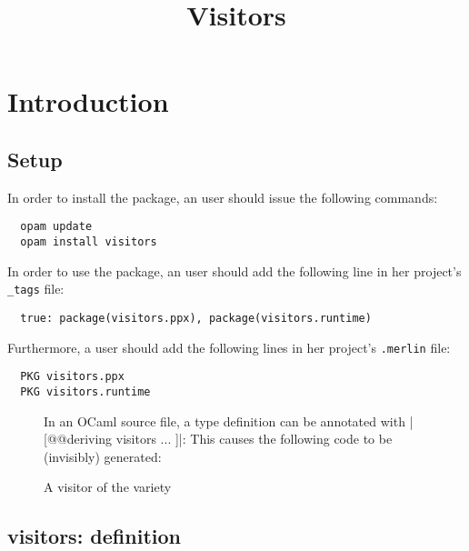 \documentclass[onecolumn,11pt,nocopyrightspace]{sigplanconf}
\title{Visitors}
\begin{document}
\maketitle


\clearpage


\section{Introduction}
\label{sec:intro}

\subsection{Setup}
\label{sec:intro:setup}

In order to install the \visitors package, an \opam user should issue the
following commands:
\begin{verbatim}
  opam update
  opam install visitors
\end{verbatim}
In order to use the \visitors package, an \ocamlbuild user should add the
following line in her project's \texttt{\_tags} file:
\begin{lstlisting}
  true: package(visitors.ppx), package(visitors.runtime)
\end{lstlisting}
Furthermore, a \merlin user should add the following lines in her project's
\texttt{.merlin} file:
\begin{lstlisting}
  PKG visitors.ppx
  PKG visitors.runtime
\end{lstlisting}


\begin{figure}[t]
In an OCaml source file, a type definition can be annotated with
\oc|[@@deriving visitors { ... }]|:
This causes the following code to be (invisibly) generated:
\caption{A visitor of the \iter variety}
\label{fig:expr00}
\end{figure}

\subsection{\iter visitors: definition}
\label{sec:intro:iter:def}
\end{document}
